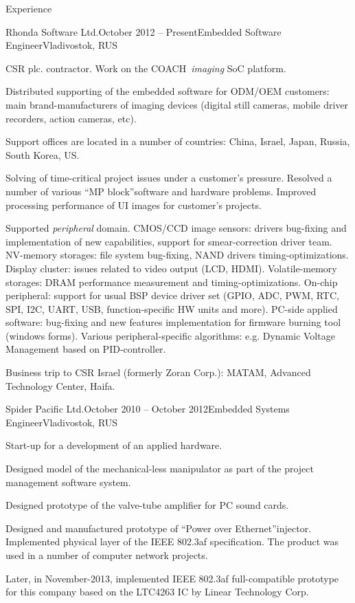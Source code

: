 \documentclass{template}
\begin{document}
\begin{rSection}{Experience}

\begin{rCompany}{Rhonda Software Ltd.}{October 2012 -- Present}{Embedded Software Engineer}{Vladivostok, RUS}
\item CSR plc. contractor. Work on the COACH\texttrademark \ \textit{imaging} SoC platform.
\item Distributed supporting of the embedded software for ODM/OEM customers: main brand-manufacturers of imaging devices (digital still cameras, mobile driver recorders, action cameras, etc).
\item Support offices are located in a number of countries: China, Israel, Japan, Russia, South Korea, US.
\item Solving of time-critical project issues under a customer's pressure. Resolved a number of various \textquotedblleft MP block\textquotedblright software and hardware problems. Improved processing performance of UI images for customer's projects.
\item Supported \textit{peripheral} domain. CMOS/CCD image sensors: drivers bug-fixing and implementation of new capabilities, support for smear-correction driver team. NV-memory storages: file system bug-fixing, NAND drivers timing-optimizations. Display cluster: issues related to video output (LCD, HDMI). Volatile-memory storages: DRAM performance measurement and timing-optimizations. On-chip peripheral: support for usual BSP device driver set (GPIO, ADC, PWM, RTC, SPI, I2C, UART, USB, function-specific HW units and more). PC-side applied software: bug-fixing and new features implementation for firmware burning tool (windows forms). Various peripheral-specific algorithms: e.g. Dynamic Voltage Management based on PID-controller.
\item Business trip to CSR Israel (formerly Zoran Corp.): MATAM, Advanced Technology Center, Haifa.
\end{rCompany}

\begin{rCompany}{Spider Pacific Ltd.}{October 2010 -- October 2012}{Embedded Systems Engineer}{Vladivostok, RUS}
\item Start-up for a development of an applied hardware.
\item Designed model of the mechanical-less manipulator as part of the project management software system.
\item Designed prototype of the valve-tube amplifier for PC sound cards.
\item Designed and manufactured prototype of \textquotedblleft Power over Ethernet\textquotedblright injector. Implemented physical layer of the IEEE 802.3af specification. The product was used in a number of computer network projects.
\item Later, in November-2013, implemented IEEE 802.3af full-compatible prototype for this company based on the LTC4263 IC by Linear Technology Corp.
\end{rCompany}

\end{rSection}
\end{document}
